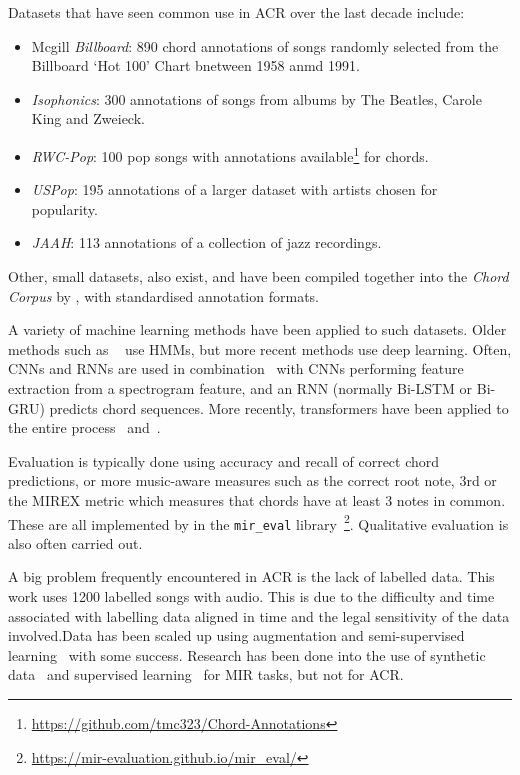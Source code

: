 Datasets that have seen common use in ACR over the last decade include:
\begin{itemize}
    \item Mcgill \emph{Billboard}: 890 chord annotations of songs randomly selected from the Billboard `Hot 100' Chart bnetween 1958 anmd 1991.~\citep{McgillBillboard}
    \item \emph{Isophonics}: 300 annotations of songs from albums by The Beatles, Carole King and Zweieck.~\citep{Isophonics}
    \item \emph{RWC-Pop}: 100 pop songs with annotations available\footnote{\url{https://github.com/tmc323/Chord-Annotations}} for chords.~\citep{RWC}
    \item \emph{USPop}: 195 annotations of a larger dataset with artists chosen for popularity.~\citep{USPop}
    \item \emph{JAAH}: 113 annotations of a collection of jazz recordings.~\cite{JAAH}
\end{itemize}

Other, small datasets, also exist, and have been compiled together into the \emph{Chord Corpus} by \citet{Choco}, with standardised annotation formats.

A variety of machine learning methods have been applied to such datasets. Older methods such as ~\cite{ACRHMM} use HMMs, but more recent methods use deep learning. Often, CNNs and RNNs are used in combination~\citep{ACRCNNRNN1,ACRLargeVocab1,ACRLargeVocab2} with CNNs performing feature extraction from a spectrogram feature, and an RNN (normally Bi-LSTM or Bi-GRU) predicts chord sequences. More recently, transformers have been applied to the entire process~\citet{MelodyTranscriptionViaGenerativePreTraining} and~\citet{HarmonyTransformer,AttendToChords}.

Evaluation is typically done using accuracy and recall of correct chord predictions, or more music-aware measures such as the correct root note, 3rd or the MIREX metric which measures that chords have at least 3 notes in common. These are all implemented by \citet{MIREVAL} in the \texttt{mir\_eval} library~\footnote{\url{https://mir-evaluation.github.io/mir_eval/}}. Qualitative evaluation is also often carried out.

A big problem frequently encountered in ACR is the lack of labelled data. This work uses 1200 labelled songs with audio. This is due to the difficulty and time associated with labelling data aligned in time and the legal sensitivity of the data involved.Data has been scaled up using augmentation and semi-supervised learning~\citep{ScalingUpSemiSupervisedLearning} with some success. Research has been done into the use of synthetic data~\citep{MusicGenTrainingData,AnnotationFreeSyntheticData} and supervised learning~\citep{MERTSupervisedLearning} for MIR tasks, but not for ACR.

